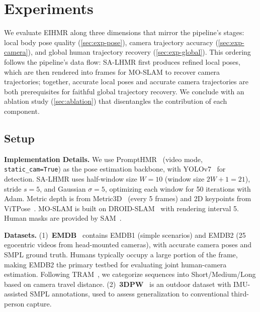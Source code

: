 \section{Experiments}
\label{sec:experiments}

We evaluate EIHMR along three dimensions that mirror the pipeline's stages: local body pose quality (\cref{sec:exp-pose}), camera trajectory accuracy (\cref{sec:exp-camera}), and global human trajectory recovery (\cref{sec:exp-global}). This ordering follows the pipeline's data flow: SA-LHMR first produces refined local poses, which are then rendered into frames for MO-SLAM to recover camera trajectories; together, accurate local poses and accurate camera trajectories are both prerequisites for faithful global trajectory recovery. We conclude with an ablation study (\cref{sec:ablation}) that disentangles the contribution of each component.

\subsection{Setup}
\label{sec:impl}

\noindent\textbf{Implementation Details.}
We use PromptHMR~\cite{PromptHMR2024} (video mode, \texttt{static\_cam=True}) as the pose estimation backbone, with YOLOv7~\cite{YOLO} for detection. SA-LHMR uses half-window size $W{=}10$ (window size $2W{+}1{=}21$), stride $s{=}5$, and Gaussian $\sigma{=}5$, optimizing each window for 50 iterations with Adam. Metric depth is from Metric3D~\cite{Metric3D2024} (every 5 frames) and 2D keypoints from ViTPose~\cite{ViTPose2022}. MO-SLAM is built on DROID-SLAM~\cite{DROIDSLAM2021} with rendering interval 5. Human masks are provided by SAM~\cite{SAM2023}.

\noindent\textbf{Datasets.}
(1)~\textbf{EMDB}~\cite{EMDB2023} contains EMDB1 (simple scenarios) and EMDB2 (25 egocentric videos from head-mounted cameras), with accurate camera poses and SMPL ground truth. Humans typically occupy a large portion of the frame, making EMDB2 the primary testbed for evaluating joint human-camera estimation. Following TRAM~\cite{TRAM2024}, we categorize sequences into Short/Medium/Long based on camera travel distance.
(2)~\textbf{3DPW}~\cite{3DPW2018} is an outdoor dataset with IMU-assisted SMPL annotations, used to assess generalization to conventional third-person capture.

